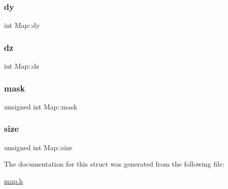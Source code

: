 \mbox{\label{structMap_a64d19e88d54fa48e437044c88f674308}} 
\subsubsection{\texorpdfstring{dy}{dy}}
{\footnotesize\ttfamily int Map\+::dy}

\mbox{\label{structMap_a1f17ec06f672496c2582b60dce199f68}} 
\subsubsection{\texorpdfstring{dz}{dz}}
{\footnotesize\ttfamily int Map\+::dz}

\mbox{\label{structMap_a2211aadc9745a27b0e07a3af85989bd5}} 
\subsubsection{\texorpdfstring{mask}{mask}}
{\footnotesize\ttfamily unsigned int Map\+::mask}

\mbox{\label{structMap_a73754296f937e5d5fbf40b4be90c8e8c}} 
\subsubsection{\texorpdfstring{size}{size}}
{\footnotesize\ttfamily unsigned int Map\+::size}



The documentation for this struct was generated from the following file\+:\begin{DoxyCompactItemize}
\item 
\hyperlink{map_8h}{map.\+h}\end{DoxyCompactItemize}
